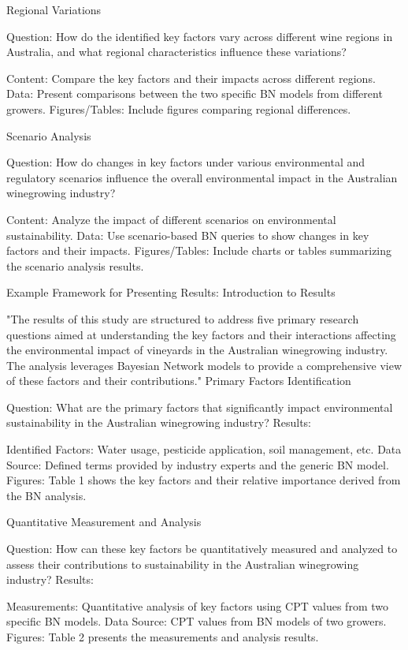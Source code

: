 Regional Variations

Question: How do the identified key factors vary across different wine regions in Australia, and what regional characteristics influence these variations?

    Content: Compare the key factors and their impacts across different regions.
    Data: Present comparisons between the two specific BN models from different growers.
    Figures/Tables: Include figures comparing regional differences.

Scenario Analysis

Question: How do changes in key factors under various environmental and regulatory scenarios influence the overall environmental impact in the Australian winegrowing industry?

    Content: Analyze the impact of different scenarios on environmental sustainability.
    Data: Use scenario-based BN queries to show changes in key factors and their impacts.
    Figures/Tables: Include charts or tables summarizing the scenario analysis results.

Example Framework for Presenting Results:
Introduction to Results

"The results of this study are structured to address five primary research questions aimed at understanding the key factors and their interactions affecting the environmental impact of vineyards in the Australian winegrowing industry. The analysis leverages Bayesian Network models to provide a comprehensive view of these factors and their contributions."
Primary Factors Identification

Question: What are the primary factors that significantly impact environmental sustainability in the Australian winegrowing industry?
Results:

    Identified Factors: Water usage, pesticide application, soil management, etc.
    Data Source: Defined terms provided by industry experts and the generic BN model.
    Figures: Table 1 shows the key factors and their relative importance derived from the BN analysis.

Quantitative Measurement and Analysis

Question: How can these key factors be quantitatively measured and analyzed to assess their contributions to sustainability in the Australian winegrowing industry?
Results:

    Measurements: Quantitative analysis of key factors using CPT values from two specific BN models.
    Data Source: CPT values from BN models of two growers.
    Figures: Table 2 presents the measurements and analysis results.

